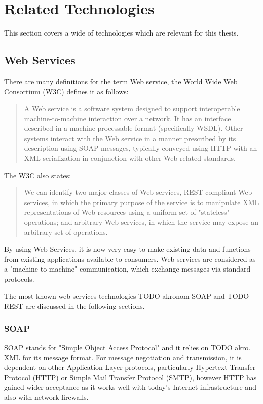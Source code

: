 \section{Related Technologies\label{sec:back_rel_tech}}
This section covers a wide of technologies which are relevant for this thesis.	

\subsection{Web Services\label{sec:back_tech_ws}}

There are many definitions for the term Web service, the World Wide Web Consortium (W3C) defines it as follows:\cite{W3C}\\
\begin{quote}
A Web service is a software system designed to support interoperable machine-to-machine interaction over a network. It has an interface described in a machine-processable format (specifically WSDL). Other systems interact with the Web service in a manner prescribed by its description using SOAP messages, typically conveyed using HTTP with an XML serialization in conjunction with other Web-related standards.
\end{quote}

The W3C also states:\cite{W3C} 
\begin{quote}
We can identify two major classes of Web services, REST-compliant Web services, in which the primary purpose of the service is to manipulate XML representations of Web resources using a uniform set of "stateless" operations; and arbitrary Web services, in which the service may expose an arbitrary set of operations.
\end{quote}

By using Web Services, it is now very easy to make existing data and functions from existing applications available to consumers. Web services are considered as a "machine to machine" communication, which  exchange messages via standard protocols.

The most known web services technologies TODO akronom SOAP and TODO REST are  discussed in the following sections.

\subsubsection{SOAP\label{sec:back_tech_ws_soap}}
SOAP stands for "Simple Object Access Protocol" and it relies on TODO akro. XML for its message format. For message negotiation and transmission, it is dependent on other Application Layer protocols, particularly Hypertext Transfer Protocol (HTTP) or Simple Mail Transfer Protocol (SMTP), however HTTP has gained wider acceptance as it works well with today's Internet infrastructure and also with network firewalls.

